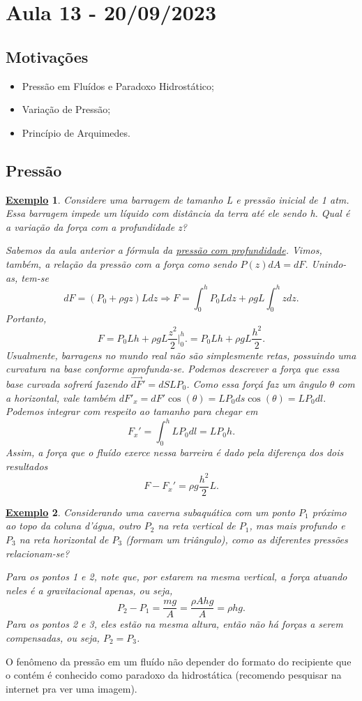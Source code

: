 \documentclass{article}
\newtheorem{example}{\underline{Exemplo}}
\begin{document}
\section{Aula 13 - 20/09/2023}
\subsection{Motivações}
\begin{itemize}
  \item Pressão em Fluídos e Paradoxo Hidrostático;
  \item Variação de Pressão;
  \item Princípio de Arquimedes.
\end{itemize}
\subsection{Pressão}
\begin{example}
  Considere uma barragem de tamanho L e pressão inicial de 1 atm. Essa barragem impede um líquido com distância da terra até ele sendo h.
  Qual é a variação da força com a profundidade z?

  Sabemos da aula anterior a fórmula da \textit{\hyperlink{pressure_submerging}{pressão com profundidade}}. Vimos, também, a relação da pressão com a força
  como sendo \(P(z)dA = dF\). Unindo-as, tem-se 
  \[
    dF = (P_{0}+\rho gz)Ldz \Rightarrow F = \int_{0}^{h}P_{0}Ldz + \rho gL \int_{0}^{h}z dz.
  \]
  Portanto, 
  \[
    F = P_{0}Lh + \rho gL \frac{z^{2}}{2}\biggl|_{0}^{h}\biggr. = P_{0}Lh + \rho gL \frac{h^{2}}{2}.
  \]
  Usualmente, barragens no mundo real não são simplesmente retas, possuindo uma curvatura na base conforme aprofunda-se. Podemos descrever 
  a força que essa base curvada sofrerá fazendo \(\vec{dF}' = dS L P_{0}\). Como essa forçá faz um ângulo \(\theta \) com a horizontal, vale também
  \(dF'_{x} = dF'\cos{(\theta )} = LP_{0}ds\cos{(\theta )} = LP_{0}dl.\) Podemos integrar com respeito ao tamanho para chegar em 
  \[
    F_{x}' = \int_{0}^{h}LP_{0}dl = LP_{0}h.
  \]
  Assim, a força que o fluído exerce nessa barreira é dado pela diferença dos dois resultados 
  \[
    F - F_{x}' = \rho g \frac{h^{2}}{2}L.
  \]
\end{example}
\begin{example}
  Considerando uma caverna subaquática com um ponto \(P_{1}\) próximo ao topo da coluna d'água,
  outro \(P_{2}\) na reta vertical de \(P_{1}\), mas mais profundo e \(P_{3}\) na reta horizontal de \(P_{3}\) 
  (formam um triângulo), como as diferentes pressões relacionam-se?

  Para os pontos 1 e 2, note que, por estarem na mesma vertical, a força atuando neles é a gravitacional apenas, ou seja, 
  \[
    P_{2} - P_{1} = \frac{mg}{A} = \frac{\rho Ahg}{A} = \rho hg.
  \]
  Para os pontos 2 e 3, eles estão na mesma altura, então não há forças a serem compensadas, ou seja, \(P_{2} = P_{3}\).
\end{example}
O fenômeno da pressão em um fluído não depender do formato do recipiente que o contém é conhecido como paradoxo da hidrostática (recomendo pesquisar na internet pra ver uma imagem).
\end{document}
